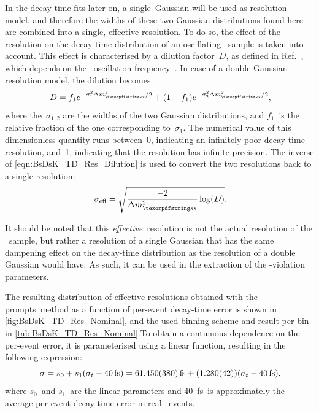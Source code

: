 In the decay-time fits later on, a single~Gaussian will be used as resolution model, and therefore the widths of these two Gaussian distributions found here are combined into a single, effective resolution.
To do so, the effect of the resolution on the decay-time distribution of an oscillating \Bs~sample is taken into account.
This effect is characterised by a dilution factor~\(D\), as defined in Ref.~\cite{Moser:1996xf}, which depends on the \Bs~oscillation frequency~\dms.
In case of a double-Gaussian resolution model, the dilution becomes
%
\begin{equation} \label{eqn:BsDsK_TD_Res_Dilution}
    D = f_{1} e^{-\sigma_1^{2} \dmssq / 2} + (1 - f_{1}) e^{-\sigma_{2}^{2} \dmssq / 2} \rlap{,}
\end{equation}
%
where the~\(\sigma_{1,2}\) are the widths of the two Gaussian distributions, and \(f_{1}\)~is the relative fraction of the one corresponding to~\(\sigma_{1}\).
The numerical value of this dimensionless quantity runs between~\num{0}, indicating an infinitely poor decay-time resolution, and~\num{1}, indicating that the resolution has infinite precision.
The inverse of \cref{eqn:BsDsK_TD_Res_Dilution} is used to convert the two resolutions back to a single resolution:
%
\begin{equation} \label{eqn:BsDsK_TD_Res_EffectiveSigma}
    \seff = \sqrt{\dfrac{-2}{\dmssq} \log(D)} \rlap{.}
\end{equation}

It should be noted that this \emph{effective}~resolution is not the actual resolution of the \Bs~sample, but rather a resolution of a single Gaussian that has the same dampening effect on the decay-time distribution as the resolution of a double Gaussian would have.
As such, it can be used in the extraction of the \CP-violation parameters.

The resulting distribution of effective resolutions obtained with the prompts~\Dspm method as a function of per-event decay-time error is shown in \cref{fig:BsDsK_TD_Res_Nominal}, and the used binning scheme and result per bin in \cref{tab:BsDsK_TD_Res_Nominal}.To obtain a continuous dependence on the per-event error, it is parameterised using a linear function, resulting in the following expression:
%
\begin{equation} \label{eqn:BsDsK_TD_Res_Nominal}
    \sigma = s_{0} + s_{1} (\dt - \SI{40}{\fs}) = \SI{61.450 +- 0.380}{\fs} + (\num{1.280 +- 0.042}) (\dt - \SI{40}{\fs}) \rlap{,}
\end{equation}
%
where \(s_{0}\)~and \(s_{1}\)~are the linear parameters and \SI{40}{\fs}~is approximately the average per-event decay-time error in real \BsDsK~events.

